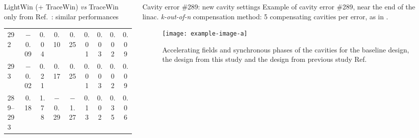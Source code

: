 \begin{frame}[t]
\begin{columns}[t]
\begin{column}{\colwidth}
\begin{block}{LightWin (+ TraceWin) \emph{vs} TraceWin only from Ref.~: similar performances}
\begin{table}
\begin{center}
\begin{tabular}{@{} l c c c c c c c c @{}}
                     292  & \alert{\num{-0.09}} &\alert{\num{0.04}}& \num{ 0.10} &  \num{0.25} & \num{0.01} & \num{0.03}         & \num{0.02}& \num{0.09}                   \\
                     293  & \num{-0.02}         &\num{0.21}        & \num{ 0.17} &  \num{0.25} & \num{0.01} & \num{0.03}         & \num{0.02}& \num{0.09}                   \\
                     289--293& \num{ 0.18}         &\num{1.78}  & \num{-0.29} &  \num{-1.27} & \alert{\num{0.13}} & \alert{\num{0.02}}         & \alert{\num{0.35}}& \alert{\num{0.06}}                   \\
                     \bottomrule
                  \end{tabular}
               \end{center}
            \end{table}
         \end{block}

      \end{column}
      \separatorcolumn
      \begin{column}{\colwidth}
         \begin{block}{Cavity error \#289: new cavity settings}
            Example of cavity error \#289, near the end of the linac.
            \emph{k-out-of-n} compensation method: \num{5} compensating cavities per error, as in .
            \begin{figure}
               \centering
               \texttt{[image: example-image-a]}
               \caption{%
                  Accelerating fields and synchronous phases of the cavities for the baseline design, the design from this study and the design from previous study Ref.
               }
            \end{figure}
         \end{block}


\end{column}
\end{columns}
\end{frame}
